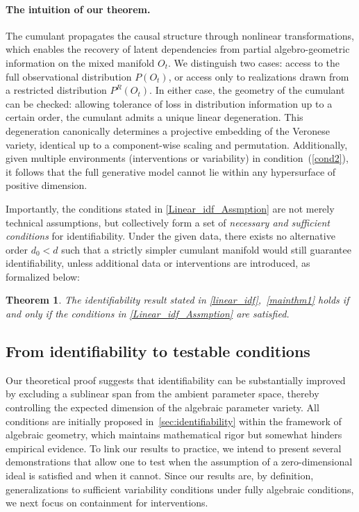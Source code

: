 \documentclass[10pt]{article}
\numberwithin{figure}{section}
\newtheorem{theorem}{Theorem}
\begin{document}
\paragraph{The intuition of our theorem.} The cumulant propagates the causal structure through nonlinear transformations, which enables the recovery of latent dependencies from partial algebro-geometric information 
on the mixed manifold $O_t$. We distinguish two cases: access to the full observational distribution $P(O_t)$, or access only to realizations drawn from a restricted distribution $P^{R}(O_t)$. In either case, the geometry of the cumulant can be checked: allowing tolerance of loss in distribution information up to a certain order, the cumulant admits a unique linear degeneration. This degeneration canonically determines a projective embedding of the Veronese variety, identical up to a component-wise scaling and permutation. Additionally, given multiple environments (interventions or variability) in condition~(\ref{cond2}), it follows that the full generative model cannot lie within any hypersurface of positive dimension.

Importantly, the conditions stated in \autoref{Linear_idf_Assmption} are not merely technical assumptions, but collectively form a set of \textit{necessary and sufficient conditions} for identifiability. Under the given data, there exists no alternative order $d_0 < d$ such that a strictly simpler cumulant manifold would still guarantee identifiability, unless additional data or interventions are introduced, as formalized below:
\begin{theorem}\label{mainthm3}
    The identifiability result stated in \autoref{linear_idf},~\ref{mainthm1} holds if and only if the conditions in \autoref{Linear_idf_Assmption} are satisfied.
\end{theorem}

\subsection{From identifiability to testable conditions}

Our theoretical proof suggests that identifiability can be substantially improved by excluding a sublinear span from the ambient parameter space, thereby controlling the expected dimension of the algebraic parameter variety. All conditions are initially proposed in~\ref{sec:identifiability} within the framework of algebraic geometry, which maintains mathematical rigor but somewhat hinders empirical evidence. To link our results to practice, we intend to present several demonstrations that allow one to test when the assumption of a zero-dimensional ideal is satisfied and when it cannot.  Since our results are, by definition, generalizations to sufficient variability conditions under fully algebraic conditions, we next focus on containment for interventions.
\end{document}
